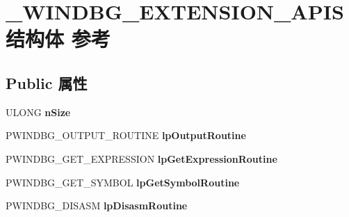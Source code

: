 \hypertarget{struct___w_i_n_d_b_g___e_x_t_e_n_s_i_o_n___a_p_i_s}{}\section{\+\_\+\+W\+I\+N\+D\+B\+G\+\_\+\+E\+X\+T\+E\+N\+S\+I\+O\+N\+\_\+\+A\+P\+I\+S结构体 参考}
\label{struct___w_i_n_d_b_g___e_x_t_e_n_s_i_o_n___a_p_i_s}
\subsection*{Public 属性}
\begin{DoxyCompactItemize}
\item 
\mbox{\label{struct___w_i_n_d_b_g___e_x_t_e_n_s_i_o_n___a_p_i_s_a69183eb857e8f2b5e2c5e88478af975e}} 
U\+L\+O\+NG {\bfseries n\+Size}
\item 
\mbox{\label{struct___w_i_n_d_b_g___e_x_t_e_n_s_i_o_n___a_p_i_s_a39689eb0b330c11b20af7d78c18d3962}} 
P\+W\+I\+N\+D\+B\+G\+\_\+\+O\+U\+T\+P\+U\+T\+\_\+\+R\+O\+U\+T\+I\+NE {\bfseries lp\+Output\+Routine}
\item 
\mbox{\label{struct___w_i_n_d_b_g___e_x_t_e_n_s_i_o_n___a_p_i_s_a54a7b07c6e97f3484e3811ab5048c865}} 
P\+W\+I\+N\+D\+B\+G\+\_\+\+G\+E\+T\+\_\+\+E\+X\+P\+R\+E\+S\+S\+I\+ON {\bfseries lp\+Get\+Expression\+Routine}
\item 
\mbox{\label{struct___w_i_n_d_b_g___e_x_t_e_n_s_i_o_n___a_p_i_s_a2bdbf6c5add3ebdf4d6a13f4b3b7aee4}} 
P\+W\+I\+N\+D\+B\+G\+\_\+\+G\+E\+T\+\_\+\+S\+Y\+M\+B\+OL {\bfseries lp\+Get\+Symbol\+Routine}
\item 
\mbox{\label{struct___w_i_n_d_b_g___e_x_t_e_n_s_i_o_n___a_p_i_s_a7631d21c3aa5bf43d260867aca719fe5}} 
P\+W\+I\+N\+D\+B\+G\+\_\+\+D\+I\+S\+A\+SM {\bfseries lp\+Disasm\+Routine}
\item 
\mbox{\label{struct___w_i_n_d_b_g___e_x_t_e_n_s_i_o_n___a_p_i_s_aeb1e50d90b08912a6baf8f2915a68d66}} 

\end{DoxyCompactItemize}
